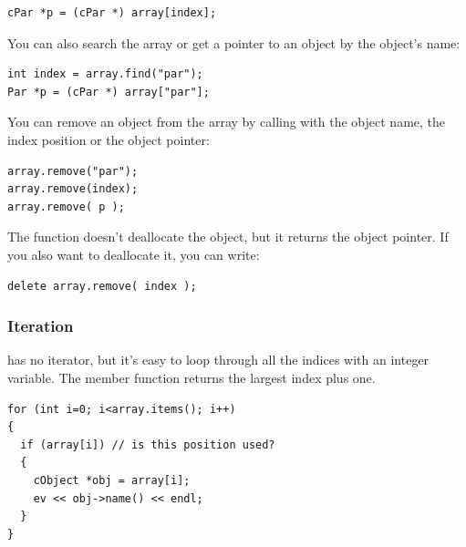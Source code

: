 \begin{verbatim}
cPar *p = (cPar *) array[index];
\end{verbatim}

You can also search the array or get a pointer to an object by
the object's name:

\begin{verbatim}
int index = array.find("par");
Par *p = (cPar *) array["par"];
\end{verbatim}


You can remove an object from the array by calling 
with the object name, the index position or the object pointer:

\begin{verbatim}
array.remove("par");
array.remove(index);
array.remove( p );
\end{verbatim}


The  function doesn't deallocate the object, but it
returns the object pointer. If you also want to deallocate it, you can
write:

\begin{verbatim}
delete array.remove( index );
\end{verbatim}

\subsubsection{Iteration}


 has no iterator, but it's easy to loop through all the
indices with an integer variable. The  member function
returns the largest index plus one.

\begin{verbatim}
for (int i=0; i<array.items(); i++)
{
  if (array[i]) // is this position used?
  {
    cObject *obj = array[i];
    ev << obj->name() << endl;
  }
}
\end{verbatim}


%
%
%
%




